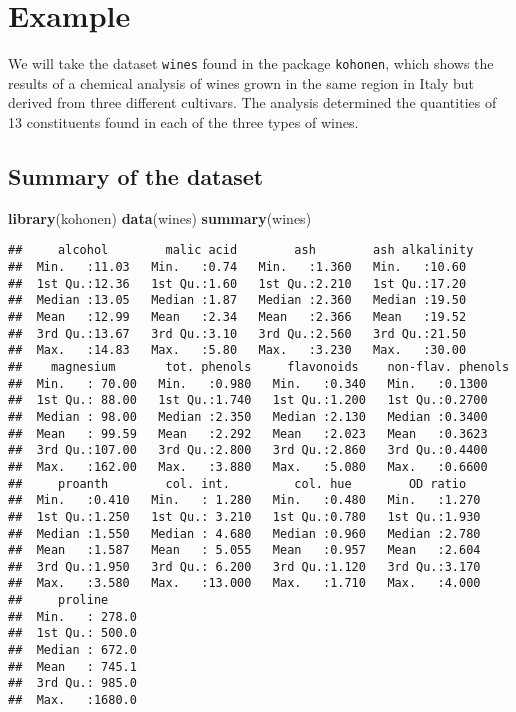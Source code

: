 \documentclass[]{book}
\newenvironment{Shaded}{\begin{snugshade}}{\end{snugshade}}
\newcommand{\KeywordTok}[1]{\textcolor[rgb]{0.13,0.29,0.53}{\textbf{{#1}}}}
\newcommand{\NormalTok}[1]{{#1}}
\begin{document}
\section{Example}\label{example}

We will take the dataset \texttt{wines} found in the package
\texttt{kohonen}, which shows the results of a chemical analysis of
wines grown in the same region in Italy but derived from three different
cultivars. The analysis determined the quantities of 13 constituents
found in each of the three types of wines.

\subsection{Summary of the dataset}\label{summary-of-the-dataset}

\begin{Shaded}
\begin{Highlighting}[]
\KeywordTok{library}\NormalTok{(kohonen)}
\KeywordTok{data}\NormalTok{(wines)}
\KeywordTok{summary}\NormalTok{(wines)}
\end{Highlighting}
\end{Shaded}

\begin{verbatim}
##     alcohol        malic acid        ash        ash alkalinity 
##  Min.   :11.03   Min.   :0.74   Min.   :1.360   Min.   :10.60  
##  1st Qu.:12.36   1st Qu.:1.60   1st Qu.:2.210   1st Qu.:17.20  
##  Median :13.05   Median :1.87   Median :2.360   Median :19.50  
##  Mean   :12.99   Mean   :2.34   Mean   :2.366   Mean   :19.52  
##  3rd Qu.:13.67   3rd Qu.:3.10   3rd Qu.:2.560   3rd Qu.:21.50  
##  Max.   :14.83   Max.   :5.80   Max.   :3.230   Max.   :30.00  
##    magnesium       tot. phenols     flavonoids    non-flav. phenols
##  Min.   : 70.00   Min.   :0.980   Min.   :0.340   Min.   :0.1300   
##  1st Qu.: 88.00   1st Qu.:1.740   1st Qu.:1.200   1st Qu.:0.2700   
##  Median : 98.00   Median :2.350   Median :2.130   Median :0.3400   
##  Mean   : 99.59   Mean   :2.292   Mean   :2.023   Mean   :0.3623   
##  3rd Qu.:107.00   3rd Qu.:2.800   3rd Qu.:2.860   3rd Qu.:0.4400   
##  Max.   :162.00   Max.   :3.880   Max.   :5.080   Max.   :0.6600   
##     proanth        col. int.         col. hue        OD ratio    
##  Min.   :0.410   Min.   : 1.280   Min.   :0.480   Min.   :1.270  
##  1st Qu.:1.250   1st Qu.: 3.210   1st Qu.:0.780   1st Qu.:1.930  
##  Median :1.550   Median : 4.680   Median :0.960   Median :2.780  
##  Mean   :1.587   Mean   : 5.055   Mean   :0.957   Mean   :2.604  
##  3rd Qu.:1.950   3rd Qu.: 6.200   3rd Qu.:1.120   3rd Qu.:3.170  
##  Max.   :3.580   Max.   :13.000   Max.   :1.710   Max.   :4.000  
##     proline      
##  Min.   : 278.0  
##  1st Qu.: 500.0  
##  Median : 672.0  
##  Mean   : 745.1  
##  3rd Qu.: 985.0  
##  Max.   :1680.0
\end{verbatim}
\end{document}
